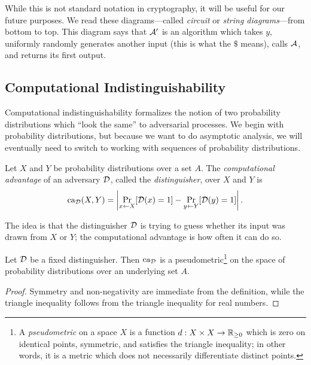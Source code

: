 While this is not standard notation in cryptography, it will be useful for our future purposes.
We read these diagrams---called \emph{circuit} or \emph{string diagrams}---from
bottom to top. This diagram says that $\mathcal{A}'$ is an algorithm which takes $y$,
uniformly randomly generates another input (this is what the $\$$ means), calls
$\mathcal{A}$, and returns its first output.

\subsection{Computational Indistinguishability}

Computational indistinguishability formalizes the notion of two probability
distributions which ``look the same'' to adversarial processes. We begin with
probability distributions, but because we want to do asymptotic analysis, we
will eventually need to switch to working with sequences of probability
distributions.

\begin{dfn}\label{def:computational advantage}
  Let $X$ and $Y$ be probability distributions over a set $A$. The \emph{computational
  advantage} of an adversary $\mathcal{D}$, called the
  \emph{distinguisher}, over $X$ and $Y$ is \[
    \operatorname{ca}_{\mathcal{D}}(X, Y) = \left|\Pr_{x\leftarrow X}[\mathcal{D}(x) = 1] - \Pr_{y\leftarrow Y}[\mathcal{D}(y) = 1]\right|.
  \]
\end{dfn}

The idea is that the distinguisher $\mathcal{D}$ is trying to guess whether its input
was drawn from $X$ or $Y$; the computational advantage is how often it can do
so.

\begin{prop}\label{thm:advantage is metric}
  Let $\mathcal{D}$ be a fixed distinguisher. Then $\operatorname{ca}_{\mathcal{D}}$ is a
  pseudometric\footnote{
    A \emph{pseudometric} on a space $X$ is a function $d: X\times X\to\mathbb{R}_{\geq 0}$ which
    is zero on identical points, symmetric, and satisfies the triangle
    inequality; in other words, it is a metric which does not necessarily
    differentiate distinct points.
  } on the
  space of probability distributions over an underlying set $A$.
\end{prop}

\begin{proof}
  Symmetry and non-negativity are immediate from the definition, while the
  triangle inequality follows from the triangle inequality for real numbers.
\end{proof}

